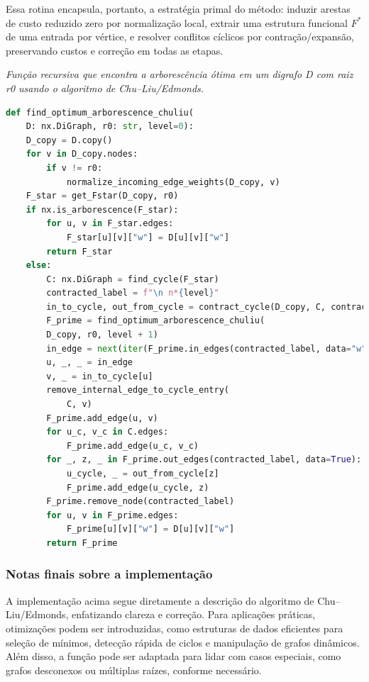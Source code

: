 Essa rotina encapsula, portanto, a estratégia primal do método: induzir arestas de custo reduzido zero por normalização local, extrair uma estrutura funcional \(F^*\) de uma entrada por vértice, e resolver conflitos cíclicos por contração/expansão, preservando custos e correção em todas as etapas.

\begin{tcolorbox}[
        enhanced, breakable,
        colframe=blue!60!black, colback=blue!2,
        colbacktitle=blue!15, coltitle=black,
        title={Procedimento principal (recursivo)},
        boxed title style={sharp corners, boxrule=0.6pt},
        sharp corners, boxrule=0.6pt
    ]
    \emph{Função recursiva que encontra a arborescência ótima em um digrafo D com raiz r0 usando o algoritmo de Chu–Liu/Edmonds.}
    \tcblower
    \begin{lstlisting}[mathescape=true, language=Python]
def find_optimum_arborescence_chuliu(
    D: nx.DiGraph, r0: str, level=0):
    D_copy = D.copy()
    for v in D_copy.nodes:
        if v != r0:
            normalize_incoming_edge_weights(D_copy, v)
    F_star = get_Fstar(D_copy, r0)
    if nx.is_arborescence(F_star):
        for u, v in F_star.edges:
            F_star[u][v]["w"] = D[u][v]["w"]
        return F_star
    else:
        C: nx.DiGraph = find_cycle(F_star)
        contracted_label = f"\n n*{level}"
        in_to_cycle, out_from_cycle = contract_cycle(D_copy, C, contracted_label)
        F_prime = find_optimum_arborescence_chuliu(
        D_copy, r0, level + 1)
        in_edge = next(iter(F_prime.in_edges(contracted_label, data="w")), None)
        u, _, _ = in_edge
        v, _ = in_to_cycle[u]
        remove_internal_edge_to_cycle_entry(
            C, v)
        F_prime.add_edge(u, v)
        for u_c, v_c in C.edges:
            F_prime.add_edge(u_c, v_c)
        for _, z, _ in F_prime.out_edges(contracted_label, data=True):
            u_cycle, _ = out_from_cycle[z]
            F_prime.add_edge(u_cycle, z)
        F_prime.remove_node(contracted_label)
        for u, v in F_prime.edges:
            F_prime[u][v]["w"] = D[u][v]["w"]
        return F_prime 
\end{lstlisting}
\end{tcolorbox}

\subsubsection{Notas finais sobre a implementação}

A implementação acima segue diretamente a descrição do algoritmo de Chu–Liu/Edmonds, enfatizando clareza e correção. Para aplicações práticas, otimizações podem ser introduzidas, como estruturas de dados eficientes para seleção de mínimos, detecção rápida de ciclos e manipulação de grafos dinâmicos. Além disso, a função pode ser adaptada para lidar com casos especiais, como grafos desconexos ou múltiplas raízes, conforme necessário.


